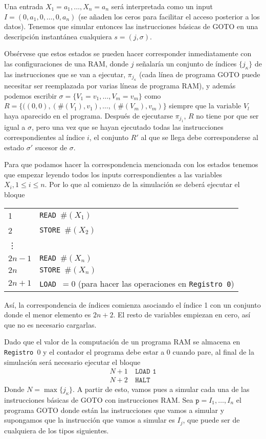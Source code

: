 \documentclass[twoside]{article}
\begin{document}
Una entrada $X_1=a_1,\dots, X_n=a_n$ será interpretada como un input $I=(0,a_1,0,\dots,0, a_n)$ (se añaden los ceros para facilitar el acceso posterior a los datos). Tenemos que simular entonces las instrucciones básicas de GOTO en una descripción instantánea cualquiera $s=(j,\sigma)$. 

Obsérvese que estos estados se pueden hacer corresponder inmediatamente con las configuraciones de una RAM, donde $j$ señalaría un conjunto de índices $\{j_\kappa\}$ de las instrucciones que se van a ejecutar, $\pi_{j_\kappa}$ (cada línea de programa GOTO puede necesitar ser reemplazada por varias líneas de programa RAM), y además podemos escribir $\sigma=\{V_1=v_1,\dots,V_m=v_m\}$ como $R=\{((0,0),(\#(V_1),v_1),\dots,(\#(V_m),v_m)\}$ siempre que la variable $V_l$ haya aparecido en el programa. Después de ejecutarse $\pi_{j_1}$, $R$ no tiene por que ser igual a $\sigma$, pero una vez que se hayan ejecutado todas las instrucciones correspondientes al índice $i$, el conjunto $R'$ al que se llega debe corresponderse al estado $\sigma'$ sucesor de $\sigma$. 

Para que podamos hacer la correspondencia mencionada con los estados tenemos que empezar leyendo todos los inputs correspondientes a las variables $X_i, 1\leq i\leq n$. Por lo que al comienzo de la simulación se deberá ejecutar el bloque

\begin{tabular}{l l}
1 & \texttt{READ }$\#(X_1)$\\
2 & \texttt{STORE }$\#(X_2)$\\
\vdots & \\
$2n-1$ & \texttt{READ }$\#(X_n)$\\
$2n$ & \texttt{STORE }$\#(X_n)$\\
$2n+1$ & \texttt{LOAD }$=0$ (para hacer las operaciones en \texttt{Registro 0})
\end{tabular}

\vspace{0.5cm}

Así, la correspondencia de índices comienza asociando el índice 1 con un conjunto donde el menor elemento es $2n+2$. El resto de variables empiezan en cero, así que no es necesario cargarlas.

\newpage

Dado que el valor de la computación de un programa RAM se almacena en \texttt{Registro }0 y el contador el programa debe estar a 0 cuando pare, al final de la simulación será necesario ejecutar el bloque
\begin{align*}
N+1\ &\texttt{LOAD 1}\\
N+2\ &\texttt{HALT}
\end{align*}
Donde $N=\max\{j_\kappa\}$. A partir de esto, vamos pues a simular cada una de las instrucciones básicas de GOTO con instrucciones RAM. Sea $\texttt{p}=I_1,\dots,I_n$ el programa GOTO donde están las instrucciones que vamos a simular y supongamos que la instrucción que vamos a simular es $I_j$, que puede ser de cualquiera de los tipos siguientes. 
\end{document}
